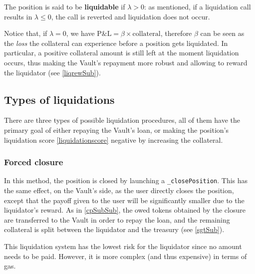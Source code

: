 \documentclass[a4paper,10 pt]{article}
\theoremstyle{definition}
\begin{document}
The position is said to be {\bf liquidable} if $\lambda > 0$: as mentioned, if a liquidation call results in $\lambda \le 0$, the call is reverted and liquidation does not occur.

Notice that, if $\lambda = 0$, we have $\text{P\&L} = \beta\times\text{collateral}$, therefore $\beta$ can be seen as the {\it loss} the collateral can experience before a position gets liquidated. In particular, a positive collateral amount is still left at the moment liquidation occurs, thus making the Vault's repayment more robust and allowing to reward the liquidator (see \ref{liqrewSub}).

\subsection{Types of liquidations}\label{tolSub}
There are three types of possible liquidation procedures, all of them have the primary goal of either repaying the Vault's loan, or making the position's liquidation score \eqref{liquidationscore} negative by increasing the collateral.

\subsubsection{Forced closure}\label{fcSubSub}
In this method, the position is closed by launching a \verb|_closePosition|. This has the same effect, on the Vault's side, as the user directly closes the position, except that the payoff given to the user will be significantly smaller due to the liquidator's reward. As in \ref{cpSubSub}, the owed tokens obtained by the closure are transferred to the Vault in order to repay the loan, and the remaining collateral is split between the liquidator and the treasury (see \ref{sgtSub}).

This liquidation system has the lowest risk for the liquidator since no amount needs to be paid. However, it is more complex (and thus expensive) in terms of gas.
\end{document}
